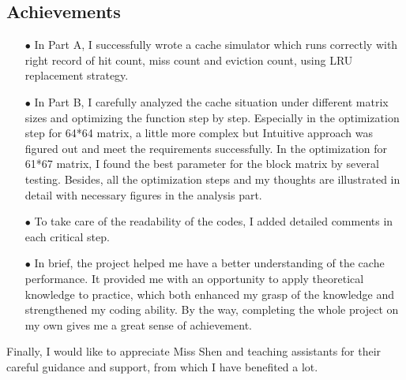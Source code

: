 \documentclass{article}
\begin{document}
\subsection{Achievements}
\begin{itemize}
\item[$\bullet$]In Part A, I successfully wrote a cache simulator which runs correctly with right record of hit count, miss count and eviction count, using LRU replacement strategy.
\item[$\bullet$]In Part B, I carefully analyzed the cache situation under different matrix sizes and optimizing the function step by step. Especially in the optimization step for 64*64 matrix, a little more complex but Intuitive approach was figured out and meet the requirements successfully. In the optimization for 61*67 matrix, I found the best parameter for the block matrix by several testing. Besides, all the optimization steps and my thoughts are illustrated in detail with necessary figures in the analysis part.
\item[$\bullet$]To take care of the readability of the codes, I added detailed comments in each critical step.
\item[$\bullet$]In brief, the project helped me have a better understanding of the cache performance. It provided me with an opportunity to apply theoretical knowledge to practice, which both enhanced my grasp of the knowledge and strengthened my coding ability. By the way, completing the whole project on my own gives me a great sense of achievement.
\end{itemize}
Finally, I would like to appreciate Miss Shen and teaching assistants for their careful guidance and support, from which I have benefited a lot.



\end{document}
